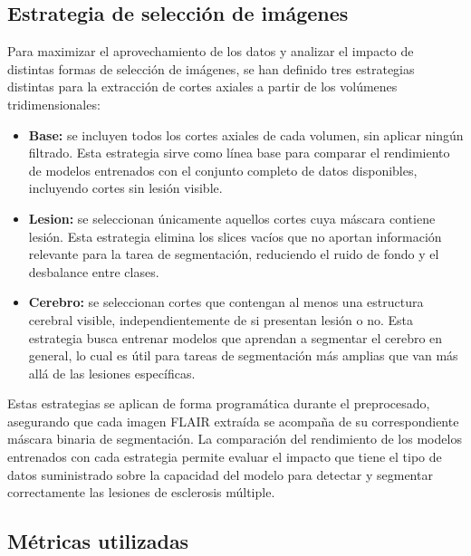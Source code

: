 \documentclass[../main.tex]{subfiles}
\begin{document}

\subsection{Estrategia de selección de imágenes}
Para maximizar el aprovechamiento de los datos y analizar el impacto de distintas formas de selección de imágenes, se han definido tres estrategias distintas para la extracción de cortes axiales a partir de los volúmenes tridimensionales:

\begin{itemize}
    \item \textbf{Base:} se incluyen todos los cortes axiales de cada volumen, sin aplicar ningún filtrado. Esta estrategia sirve como línea base para comparar el rendimiento de modelos entrenados con el conjunto completo de datos disponibles, incluyendo cortes sin lesión visible.

    \item \textbf{Lesion:} se seleccionan únicamente aquellos cortes cuya máscara contiene lesión. Esta estrategia elimina los slices vacíos que no aportan información relevante para la tarea de segmentación, reduciendo el ruido de fondo y el desbalance entre clases.

    \item \textbf{Cerebro:} se seleccionan cortes que contengan al menos una estructura cerebral visible, independientemente de si presentan lesión o no. Esta estrategia busca entrenar modelos que aprendan a segmentar el cerebro en general, lo cual es útil para tareas de segmentación más amplias que van más allá de las lesiones específicas.
\end{itemize}

Estas estrategias se aplican de forma programática durante el preprocesado, asegurando que cada imagen FLAIR extraída se acompaña de su correspondiente máscara binaria de segmentación. La comparación del rendimiento de los modelos entrenados con cada estrategia permite evaluar el impacto que tiene el tipo de datos suministrado sobre la capacidad del modelo para detectar y segmentar correctamente las lesiones de esclerosis múltiple.

\subsection{Métricas utilizadas}
\end{document}

